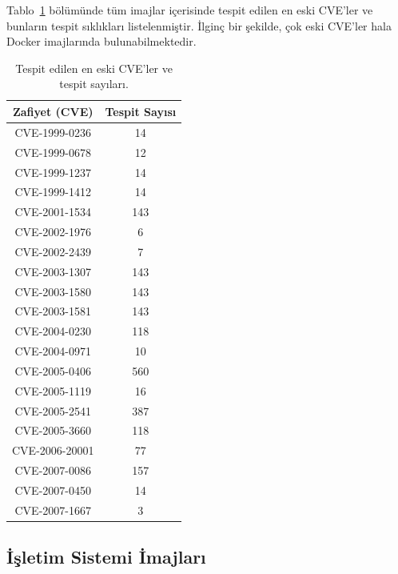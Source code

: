Tablo~\ref{tab:oldest-cves-count} bölümünde tüm imajlar içerisinde tespit edilen en eski CVE'ler ve bunların tespit sıklıkları listelenmiştir. İlginç bir şekilde, çok eski CVE'ler hala Docker imajlarında bulunabilmektedir.

\begin{table}[!htbp]
    \caption{Tespit edilen en eski CVE'ler ve tespit sayıları.}\label{tab:oldest-cves-count}
    \centering
    \begin{tabular}{ |c|c| }
        \hline
        Zafiyet (CVE) & Tespit Sayısı \\
        \hline
        CVE-1999{-}0236  & 14 \\
        CVE-1999{-}0678  & 12 \\
        CVE-1999{-}1237  & 14 \\
        CVE-1999{-}1412  & 14 \\
        CVE-2001{-}1534  & 143 \\
        CVE-2002{-}1976  & 6 \\
        CVE-2002{-}2439  & 7 \\
        CVE-2003{-}1307  & 143 \\
        CVE-2003{-}1580  & 143 \\
        CVE-2003{-}1581  & 143 \\
        CVE-2004{-}0230  & 118 \\
        CVE-2004{-}0971  & 10 \\
        CVE-2005{-}0406  & 560 \\
        CVE-2005{-}1119  & 16 \\
        CVE-2005{-}2541  & 387 \\
        CVE-2005{-}3660  & 118 \\
        CVE-2006{-}20001 & 77 \\
        CVE-2007{-}0086  & 157 \\
        CVE-2007{-}0450  & 14 \\
        CVE-2007{-}1667  & 3 \\
        \hline
    \end{tabular}
\end{table}

\subsection{İşletim Sistemi İmajları}\label{subsec:os-images}

